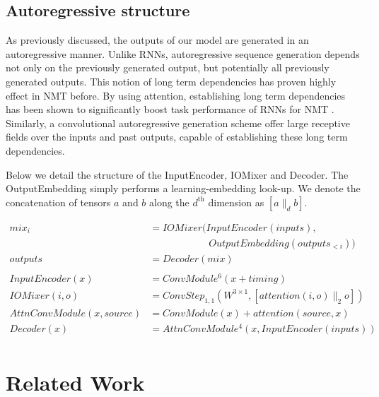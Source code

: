 \documentclass{article}
\newcommand\concat[3]{\left[#1 \parallel_#3 #2\right]}
\newcommand\cs[3]{ConvStep_{#1,#2}(#3)}
\begin{document}
\subsection{Autoregressive structure}\label{coders}

As previously discussed, the outputs of our model are generated in an autoregressive manner. Unlike RNNs, autoregressive sequence generation depends not only on the previously generated output, but potentially all previously generated outputs. This notion of long term dependencies has proven highly effect in NMT before. By using attention, establishing long term dependencies has been shown to significantly boost task performance of RNNs for NMT \cite{gru2014}. Similarly, a convolutional autoregressive generation scheme offer large receptive fields over the inputs and past outputs, capable of establishing these long term dependencies.

Below we detail the structure of the InputEncoder, IOMixer and Decoder. The OutputEmbedding simply performs a learning-embedding look-up. We denote the concatenation of tensors \(a\) and \(b\) along the \(d^{\text{th}}\) dimension as \(\concat{a}{b}{d}\).

\begin{align*}
    mix_i &= IOMixer(InputEncoder(inputs),\\
                    &\qquad\qquad\qquad OutputEmbedding(outputs_{<i}))\\
    outputs &= Decoder(mix) \\
    \\
    InputEncoder(x) &= ConvModule^6(x + timing)\\
    IOMixer(i, o) &= \cs{1}{1}{W^{3 \times 1}, \concat{attention(i, o)}{o}{2}}\\
    AttnConvModule(x, source) &= ConvModule(x) + attention(source, x)\\
    Decoder(x) &= AttnConvModule^4(x, InputEncoder(inputs))\\
\end{align*}


\section{Related Work}
\end{document}
